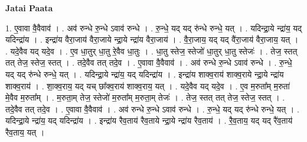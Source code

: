 \documentclass[17pt]{extarticle}
\begin{document}
\textbf{Jatai Paata} \newline

1. ए॒वावा वै॒वैवाव॑ । . अव॑ रुन्धे रु॒न्धे ऽवाव॑ रुन्धे । . रु॒न्धे॒ यद् यद् रु॑न्धे रुन्धे॒ यत् । . यदिन्द्रा॒ये न्द्रा॑य॒ यद् यदिन्द्रा॑य । . इन्द्रा॑य वैरा॒जाय॑ वैरा॒जाये न्द्रा॒ये न्द्रा॑य वैरा॒जाय॑ । . वै॒रा॒जाय॒ यद् यद् वै॑रा॒जाय॑ वैरा॒जाय॒ यत् । . यदे॒वैव यद् यदे॒व । . ए॒व धा॒तुर् धा॒तु रे॒वैव धा॒तुः । . धा॒तु स्तेज॒ स्तेजो॑ धा॒तुर् धा॒तु स्तेजः॑ । . तेज॒ स्तत् तत् तेज॒ स्तेज॒ स्तत् । . तदे॒वैव तत् तदे॒व । . ए॒वावा वै॒वैवाव॑ । . अव॑ रुन्धे रु॒न्धे ऽवाव॑ रुन्धे । . रु॒न्धे॒ यद् यद् रु॑न्धे रुन्धे॒ यत् । . यदिन्द्रा॒ये न्द्रा॑य॒ यद् यदिन्द्रा॑य । . इन्द्रा॑य शाक्व॒राय॑ शाक्व॒राये न्द्रा॒ये न्द्रा॑य शाक्व॒राय॑ । . शा॒क्व॒राय॒ यद् यच् छा᳚क्व॒राय॑ शाक्व॒राय॒ यत् । . यदे॒वैव यद् यदे॒व । . ए॒व म॒रुता᳚म् म॒रुता॑ मे॒वैव म॒रुता᳚म् । . म॒रुता॒म् तेज॒ स्तेजो॑ म॒रुता᳚म् म॒रुता॒म् तेजः॑ । . तेज॒ स्तत् तत् तेज॒ स्तेज॒ स्तत् । . तदे॒वैव तत् तदे॒व । . ए॒वावा वै॒वैवाव॑ । . अव॑ रुन्धे रु॒न्धे ऽवाव॑ रुन्धे । . रु॒न्धे॒ यद् यद् रु॑न्धे रुन्धे॒ यत् । . यदिन्द्रा॒ये न्द्रा॑य॒ यद् यदिन्द्रा॑य । . इन्द्रा॑य रैव॒ताय॑ रैव॒ताये न्द्रा॒ये न्द्रा॑य रैव॒ताय॑ । . रै॒व॒ताय॒ यद् यद् रै॑व॒ताय॑ रैव॒ताय॒ यत् । \newline
\end{document}

